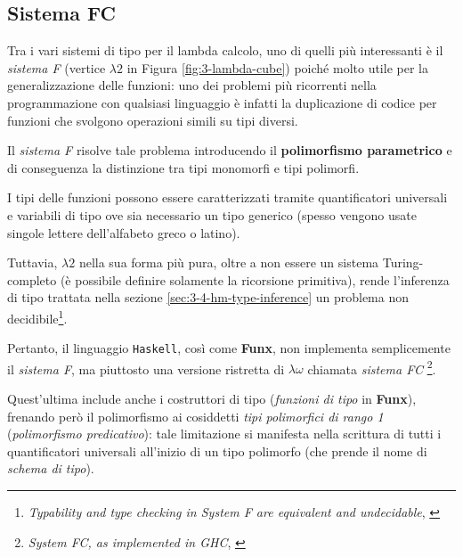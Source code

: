 \subsection{Sistema FC}
\label{sec:3-3-system-fc}

Tra i vari sistemi di tipo per il lambda calcolo, uno di quelli più interessanti è il \textit{sistema F}
(vertice $\lambda2$ in Figura \ref{fig:3-lambda-cube}) poiché molto utile per la generalizzazione delle funzioni:
uno dei problemi più ricorrenti nella programmazione con qualsiasi linguaggio è infatti la duplicazione di codice
per funzioni che svolgono operazioni simili su tipi diversi.


Il \textit{sistema F} risolve tale problema introducendo il \textbf{polimorfismo parametrico}
e di conseguenza la distinzione tra tipi monomorfi e tipi polimorfi.

\noindent I tipi delle funzioni possono essere caratterizzati tramite quantificatori universali e variabili di tipo
ove sia necessario un tipo generico (spesso vengono usate singole lettere dell'alfabeto greco o latino).


Tuttavia, $\lambda2$ nella sua forma più pura, oltre a non essere un sistema Turing-completo
(è possibile definire solamente la ricorsione primitiva), rende l'inferenza di tipo trattata nella sezione
\ref{sec:3-4-hm-type-inference} un problema non decidibile\footnote{\textit{Typability and type checking in System F
        are equivalent and undecidable}, \cite{TypabilityTypeCheckingSystemFUndecidable}}.

\noindent Pertanto, il linguaggio \texttt{Haskell}, così come \textbf{Funx}, non implementa
semplicemente il \textit{sistema F}, ma piuttosto una versione ristretta di $\lambda\omega$ chiamata \textit{sistema FC}%
\footnote{\textit{System FC, as implemented in GHC}, \cite{HaskellSystemFC}}.

\noindent Quest'ultima include anche i costruttori di tipo (\textit{funzioni di tipo} in \textbf{Funx}),
frenando però il polimorfismo ai cosiddetti \textit{tipi polimorfici di rango 1} (\textit{polimorfismo predicativo}):
tale limitazione si manifesta nella scrittura di tutti i quantificatori universali all'inizio di un tipo polimorfo
(che prende il nome di \textit{schema di tipo}).

